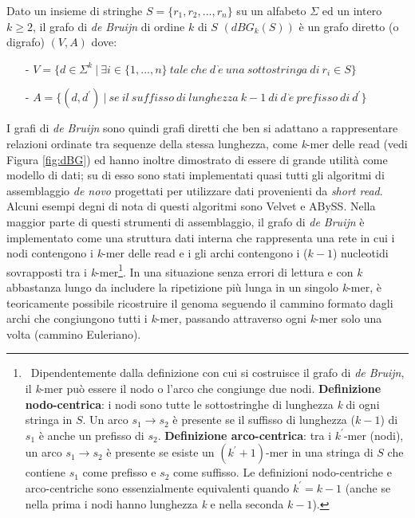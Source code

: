 \documentclass[../main.tex]{subfiles}
\begin{document}
\theoremstyle{definition}
\begin{definition} 
Dato un insieme di stringhe $S = \{r_1 , r_2 , ... , r_n\}$ su un alfabeto $\Sigma$ ed un intero $k\geq2$, il grafo di \textit{de Bruijn} di ordine $k$ di $S$ $(dBG_k (S))$ è un grafo diretto (o digrafo) $(V,A)$ dove:
\begin{itemize}
\item[-] $V = \{d \in \Sigma^k \ |\  \exists i \in \{1, ..., n\} \ tale\ che\ d\ \grave{e}\ una\ sottostringa\ di\ r_i \in S\}$
\item[-]$A = \{ (d,d^\prime)\ |\ se\ il\ suffisso\ di\ lunghezza\ k-1\ di\ d\ \grave{e}\ prefisso\ di\ d^\prime\}$
\end{itemize}
\end{definition}

\noindent
I grafi di \textit{de Bruijn} sono quindi grafi diretti che ben si adattano a rappresentare relazioni ordinate tra sequenze della stessa lunghezza, come \textit{k}-mer delle read (vedi Figura \ref{fig:dBG}) ed hanno inoltre dimostrato di essere di grande utilità come modello di dati; su di esso sono stati implementati quasi tutti gli algoritmi di assemblaggio \textit{de novo} progettati per utilizzare dati provenienti da \textit{short read}. Alcuni esempi degni di nota di questi algoritmi sono Velvet e ABySS. Nella maggior parte di questi strumenti di assemblaggio, il grafo di \textit{de Bruijn} è implementato come una struttura dati interna che rappresenta una rete in cui i nodi contengono i \textit{k}-mer delle read e i gli archi contengono i ($k-1$) nucleotidi sovrapposti tra i \textit{k}-mer\footnote{\ Dipendentemente dalla definizione con cui si costruisce il grafo di \textit{de Bruijn}, il \textit{k}-mer può essere il nodo o l'arco che congiunge due nodi. \textbf{Definizione nodo-centrica}: i nodi sono tutte le sottostringhe di lunghezza \textit{k} di ogni stringa in $S$. Un arco $s_1 \rightarrow s_2$ è presente se il suffisso di lunghezza ($k-1$) di $s_1$ è anche un prefisso di $s_2$. \textbf{Definizione arco-centrica}: tra i $k^\prime$-mer (nodi), un arco $s_1 \rightarrow s_2$ è presente se esiste un $(k^\prime+1)$-mer in una stringa di $S$ che contiene $s_1$ come prefisso e $s_2$ come suffisso. Le definizioni nodo-centriche e arco-centriche sono essenzialmente equivalenti quando $k^\prime = k-1$ (anche se nella prima i nodi hanno lunghezza \textit{k} e nella seconda $k - 1$).}. In una situazione senza errori di lettura e con \textit{k} abbastanza lungo da includere la ripetizione più lunga in un singolo \textit{k}-mer, è teoricamente possibile ricostruire il genoma seguendo il cammino formato dagli archi che congiungono tutti i \textit{k}-mer, passando attraverso ogni \textit{k}-mer solo una volta (cammino Euleriano). 
\end{document}
